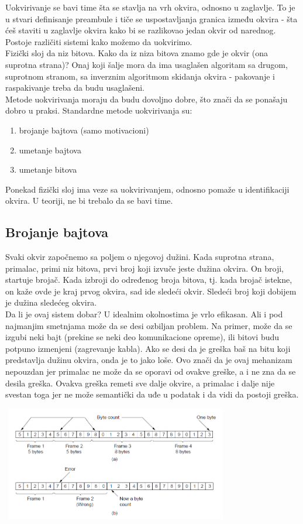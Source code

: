 \documentclass{article} %
\begin{document}
Uokvirivanje se bavi time šta se stavlja na vrh okvira, odnosno u zaglavlje. To je u stvari definisanje preambule i  tiče se uspostavljanja granica između okvira - šta ćeš staviti u zaglavlje okvira kako bi se razlikovao jedan okvir od narednog. Postoje različiti sistemi kako možemo da uokvirimo.\\

Fizički sloj da niz bitova. Kako da iz niza bitova znamo gde je okvir (ona suprotna strana)? Onaj koji šalje mora da ima usaglašen algoritam sa drugom, suprotnom stranom, sa inverznim algoritmom skidanja okvira - pakovanje i raspakivanje treba da budu usaglašeni. \\

Metode uokvirivanja moraju da budu dovoljno dobre, što znači da se ponašaju dobro u praksi. Standardne metode uokvirivanja su:
\begin{enumerate}
  \item brojanje bajtova (samo motivacioni)
  \item umetanje bajtova
  \item umetanje bitova
\end{enumerate}

Ponekad fizički sloj ima veze sa uokvirivanjem, odnosno pomaže u identifikaciji okvira. U teoriji, ne bi trebalo da se bavi time.
\subsection{Brojanje bajtova}
Svaki okvir započnemo sa poljem o njegovoj dužini. Kada suprotna strana, primalac, primi niz bitova, prvi broj koji izvuče jeste dužina okvira. On broji, startuje brojač. Kada izbroji do određenog broja bitova, tj. kada brojač istekne, on kaže ovde je kraj prvog okvira, sad ide sledeći okvir. Sledeći broj koji dobijem je dužina sledećeg okvira.\\
Da li je ovaj sistem dobar? U idealnim okolnostima je vrlo efikasan. Ali i pod najmanjim smetnjama može da se desi ozbiljan problem. Na primer, može da se izgubi neki bajt (prekine se neki deo komunikacione opreme), ili bitovi budu potpuno izmenjeni (zagrevanje kabla). Ako se desi da je greška baš na bitu koji predstavlja dužinu okvira, onda je to jako loše. Ovo znači da je ovaj mehanizam nepouzdan jer primalac ne može da se oporavi od ovakve greške, a i ne zna da se desila greška. Ovakva greška remeti sve dalje okvire, a primalac i dalje nije svestan toga jer ne može semantički da uđe u podatak i da vidi da postoji greška.
\begin{center}
\includegraphics[width=10cm, height=5cm]{brojanjeBajtova}\\
\end{center}
\end{document}
